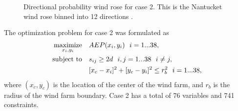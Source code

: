 \documentclass{jpconf}
\begin{document}
\begin{figure}[h!]
\begin{minipage}[t]{18pc}
		\caption{Directional probability wind rose for case 2. This is the Nantucket wind rose binned into 12 directions \cite{wrcc2017}.}
		\label{fig:freqwindrose_12dir}
	\end{minipage}
\end{figure}

The optimization problem for case 2 was formulated as
%
\begin{equation}\label{eq:case2}
	\begin{aligned} [b]
	\underset{x_i,y_i}{\textrm{maximize}} \quad & AEP(x_i,y_i)~~i=1...38,\\
	\textrm{subject to} \quad & s_{ij} \geq 2\*d~~i,j=1...38~~i \neq j,\\
	 & [x_c-x_i]^2+[y_c-y_i]^2 \leq r_{b}^2~~i=1...38,
	\end{aligned}
\end{equation}
%
where $(x_c,y_c)$ is the location of the center of the wind farm, and $r_b$ is the radius of the wind farm boundary. Case 2 has a total of 76 variables and 741 constraints.
\end{document}
